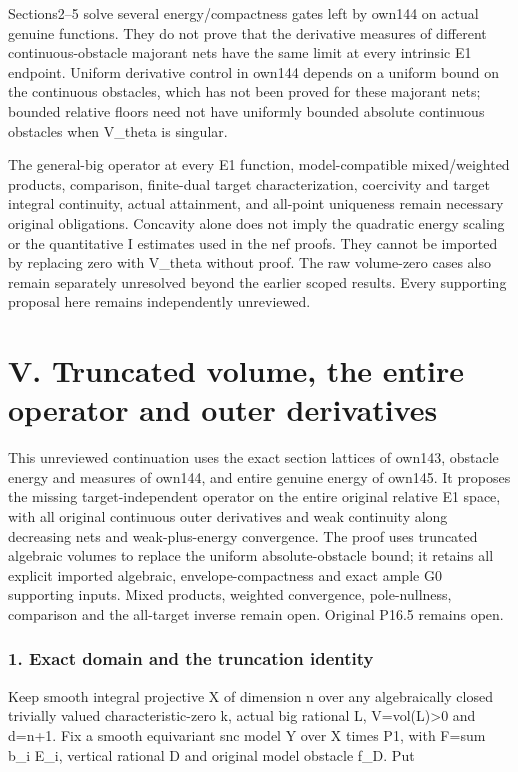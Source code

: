 \documentclass[
  10pt,
]{article}
\begin{document}
Sections2--5 solve several energy/compactness gates left by own144 on
actual genuine functions. They do not prove that the derivative measures
of different continuous-obstacle majorant nets have the same limit at
every intrinsic E1 endpoint. Uniform derivative control in own144
depends on a uniform bound on the continuous obstacles, which has not
been proved for these majorant nets; bounded relative floors need not
have uniformly bounded absolute continuous obstacles when V\_theta is
singular.

The general-big operator at every E1 function, model-compatible
mixed/weighted products, comparison, finite-dual target
characterization, coercivity and target integral continuity, actual
attainment, and all-point uniqueness remain necessary original
obligations. Concavity alone does not imply the quadratic energy scaling
or the quantitative I estimates used in the nef proofs. They cannot be
imported by replacing zero with V\_theta without proof. The raw
volume-zero cases also remain separately unresolved beyond the earlier
scoped results. Every supporting proposal here remains independently
unreviewed.

\section{V. Truncated volume, the entire operator and outer
derivatives}\label{v.-truncated-volume-the-entire-operator-and-outer-derivatives}

This unreviewed continuation uses the exact section lattices of own143,
obstacle energy and measures of own144, and entire genuine energy of
own145. It proposes the missing target-independent operator on the
entire original relative E1 space, with all original continuous outer
derivatives and weak continuity along decreasing nets and
weak-plus-energy convergence. The proof uses truncated algebraic volumes
to replace the uniform absolute-obstacle bound; it retains all explicit
imported algebraic, envelope-compactness and exact ample G0 supporting
inputs. Mixed products, weighted convergence, pole-nullness, comparison
and the all-target inverse remain open. Original P16.5 remains open.

\subsubsection{1. Exact domain and the truncation
identity}\label{exact-domain-and-the-truncation-identity}

Keep smooth integral projective X of dimension n over any algebraically
closed trivially valued characteristic-zero k, actual big rational L,
V=vol(L)\textgreater0 and d=n+1. Fix a smooth equivariant snc model Y
over X times P1, with F=sum b\_i E\_i, vertical rational D and original
model obstacle f\_D. Put
\end{document}
